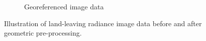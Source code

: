 \begin{figure}[thb]
\begin{subfigure}[t]{.52\linewidth}
		\caption{Georeferenced image data}		
		\label{fig:QuartzByTASI}
	\end{subfigure}
	\vspace{1.5 em}
	\caption{Illustration of land-leaving radiance image data before and after geometric pre-processing.}
	\label{fig:Georeferencing}
\end{figure}


